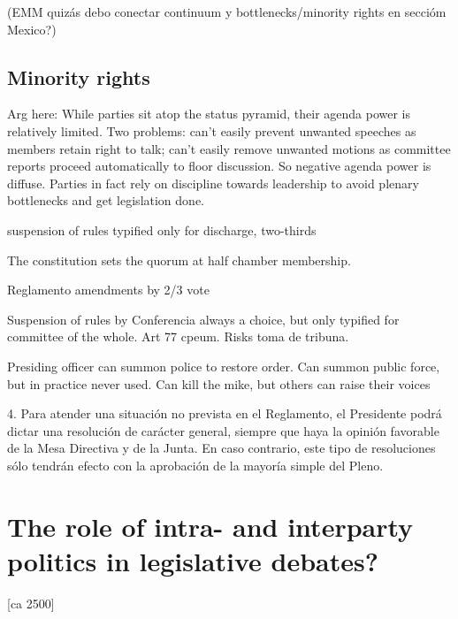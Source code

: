 \documentclass[letter,12pt]{article}
\begin{document}
(EMM quizás debo conectar continuum y bottlenecks/minority rights en seccióm Mexico?)

  \subsection{Minority rights}

Arg here: While parties sit atop the status pyramid, their agenda power is relatively limited. 
Two problems: can't easily prevent unwanted speeches as members retain right to talk; can't easily remove unwanted motions as committee reports proceed automatically to floor discussion. So negative agenda power is diffuse. 
Parties in fact rely on discipline towards leadership to avoid plenary bottlenecks and get legislation done. 

suspension of rules typified only for discharge, two-thirds

The constitution sets the quorum at half chamber membership.

Reglamento amendments by 2/3 vote

Suspension of rules by Conferencia always a choice, but only typified for committee of the whole. Art 77 cpeum. Risks toma de tribuna.

Presiding officer can summon police to restore order. 
Can summon public force, but in practice never used. 
Can kill the mike, but others can raise their voices

4. Para atender una situación no prevista en el Reglamento, el Presidente podrá dictar una resolución de carácter general, siempre que haya la opinión favorable de la Mesa Directiva y de la Junta. En caso contrario, este tipo de resoluciones sólo tendrán efecto con la aprobación de la mayoría simple del Pleno.

\section{The role of intra- and interparty politics in legislative debates?} [ca 2500]
 
\end{document}

